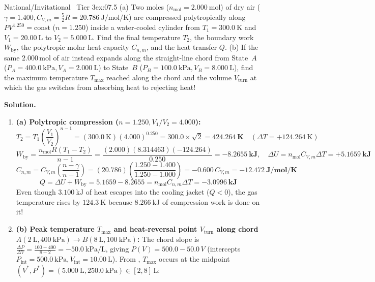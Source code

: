 \begin{workedexample}{National/Invitational \textbar\ Tier 3}{ex:07.5}
(a) Two moles ($n_{\mathrm{mol}} = \SI{2.000}{\mole}$) of dry air ($\gamma = 1.400, C_{V,m} = \frac{5}{2}R = \SI{20.786}{\joule\per\mole\per\kelvin}$) are compressed polytropically along $PV^{1.250} = \mathrm{const}$ ($n = 1.250$) inside a water-cooled cylinder from $T_1 = \SI{300.0}{\kelvin}$ and $V_1 = \SI{20.00}{\liter}$ to $V_2 = \SI{5.000}{\liter}$. Find the final temperature $T_2$, the boundary work $W_{\mathrm{by}}$, the polytropic molar heat capacity $C_{n,m}$, and the heat transfer $Q$. (b) If the same $2.000\,\si{\mole}$ of air instead expands along the straight-line chord from State~$A$ ($P_A = \SI{400.0}{\kilo\pascal}, V_A = \SI{2.000}{\liter}$) to State~$B$ ($P_B = \SI{100.0}{\kilo\pascal}, V_B = \SI{8.000}{\liter}$), find the maximum temperature $T_{\max}$ reached along the chord and the volume $V_{\mathrm{turn}}$ at which the gas switches from absorbing heat to rejecting heat!
\par\smallskip\noindent
\textbf{Solution.}
\begin{enumerate}
  \item \textbf{(a) Polytropic compression ($n = 1.250, V_1/V_2 = 4.000$):}
  \[
    T_2 = T_1\left(\frac{V_1}{V_2}\right)^{n - 1} = (\SI{300.0}{\kelvin})(4.000)^{0.250} = 300.0 \times \sqrt{2} = \mathbf{\SI{424.264}{\kelvin}} \quad (\Delta T = +\SI{124.264}{\kelvin})
  \]
  \[
    W_{\mathrm{by}} = \frac{n_{\mathrm{mol}}R(T_1 - T_2)}{n - 1} = \frac{(2.000)(8.314463)(-124.264)}{0.250} = \mathbf{\SI{-8.2655}{\kilo\joule}}, \quad \Delta U = n_{\mathrm{mol}}C_{V,m}\Delta T = \mathbf{+\SI{5.1659}{\kilo\joule}}
  \]
  \[
    C_{n,m} = C_{V,m}\left(\frac{n - \gamma}{n - 1}\right) = (20.786)\left(\frac{1.250 - 1.400}{1.250 - 1.000}\right) = -0.600\,C_{V,m} = \mathbf{\SI{-12.472}{\joule\per\mole\per\kelvin}}
  \]
  \[
    Q = \Delta U + W_{\mathrm{by}} = 5.1659 - 8.2655 = n_{\mathrm{mol}}C_{n,m}\Delta T = \mathbf{\SI{-3.0996}{\kilo\joule}}
  \]
  Even though $\SI{3.100}{\kilo\joule}$ of heat escapes into the cooling jacket ($Q < 0$), the gas temperature rises by $\SI{124.3}{\kelvin}$ because $\SI{8.266}{\kilo\joule}$ of compression work is done on it!
  \item \textbf{(b) Peak temperature $T_{\max}$ and heat-reversal point $V_{\mathrm{turn}}$ along chord $A(\SI{2}{\liter},\SI{400}{\kilo\pascal})\to B(\SI{8}{\liter},\SI{100}{\kilo\pascal})$:}
  The chord slope is $\frac{\Delta P}{\Delta V} = \frac{100 - 400}{8 - 2} = \SI{-50.0}{\kilo\pascal\per\liter}$, giving $P(V) = 500.0 - 50.0\,V$ (intercepts $P_{\mathrm{int}} = \SI{500.0}{\kilo\pascal}, V_{\mathrm{int}} = \SI{10.00}{\liter}$). From , $T_{\max}$ occurs at the midpoint $(V^*, P^*) = (\SI{5.000}{\liter}, \SI{250.0}{\kilo\pascal}) \in [2, 8]\,\si{\liter}$:

\end{enumerate}
\end{workedexample}
